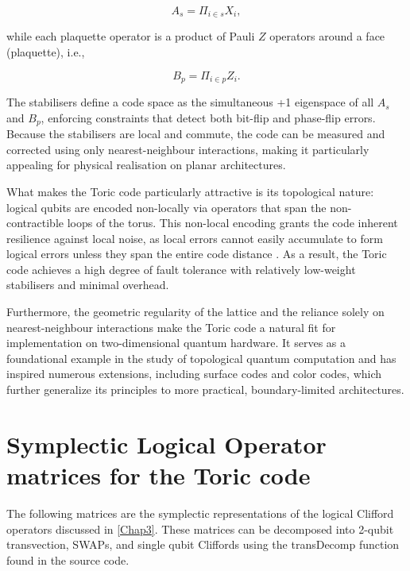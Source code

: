 \documentclass[12pt, a4paper]{report}
\begin{document}
\begin{appendices}
\begin{equation}
    A_s=\Pi_{i\in s}X_i,
\end{equation}

while each plaquette operator is a product of Pauli \(Z\) operators around a face (plaquette), i.e., 

\begin{equation}
    B_p=\Pi_{i\in p}Z_i.
\end{equation}

The stabilisers define a code space as the simultaneous +1 eigenspace of all \(A_s\) and \(B_p\), enforcing constraints that detect both bit-flip and phase-flip errors. Because the stabilisers are local and commute, the code can be measured and corrected using only nearest-neighbour interactions, making it particularly appealing for physical realisation on planar architectures.

What makes the Toric code particularly attractive is its topological nature: logical qubits are encoded non-locally via operators that span the non-contractible loops of the torus. This non-local encoding grants the code inherent resilience against local noise, as local errors cannot easily accumulate to form logical errors unless they span the entire code distance \cite{eczoo_toric}. As a result, the Toric code achieves a high degree of fault tolerance with relatively low-weight stabilisers and minimal overhead.

Furthermore, the geometric regularity of the lattice and the reliance solely on nearest-neighbour interactions make the Toric code a natural fit for implementation on two-dimensional quantum hardware. It serves as a foundational example in the study of topological quantum computation and has inspired numerous extensions, including surface codes and color codes, which further generalize its principles to more practical, boundary-limited architectures.

\chapter{Symplectic Logical Operator matrices for the Toric code} \label{Appendix D}
The following matrices are the symplectic representations of the logical Clifford operators discussed in \ref{Chap3}. These matrices can be decomposed into 2-qubit transvection, SWAPs, and single qubit Cliffords using the transDecomp function found in the source code.



\end{appendices}
\end{document}
